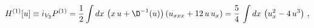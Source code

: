 \begin{equation*}
  H^{(1)}[u] \equiv i_{V_{2}} P^{(1)} = \frac{1}{2}\int dx\,\left(x\,u
+ \D^{-1}(u)\right)\left(u_{xxx}+12\,u\,u_x\right) = \frac{5}{4}\,\int
dx\,\left(u_x^2-4\,u^3\right)\,,
\end{equation*}


